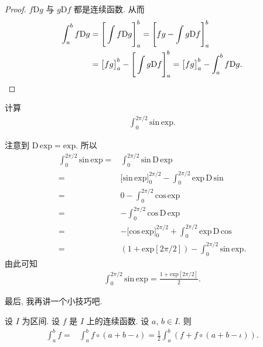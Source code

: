 \begin{proof}
    $f\mathrm{D}g$ 与 $g\mathrm{D}f$ 都是连续函数.
    从而
    \begin{align*}
        \int_{a}^{b} {f\mathrm{D}g}
        = {} & \Bigg[ \int {f\mathrm{D}g} \Bigg]_{a}^{b}
        = \Bigg[ fg - \int {g\mathrm{D}f} \Bigg]_{a}^{b}                          \\
        = {} & \big[ fg \big]_{a}^{b} - \Bigg[ \int {g\mathrm{D}f} \Bigg]_{a}^{b}
        = \big[ fg \big]_{a}^{b} - \int_{a}^{b} {f\mathrm{D}g}. \qedhere
    \end{align*}
\end{proof}

\begin{example}
    计算
    \begin{align*}
        \int_{0}^{2\pi/2} {\mathrm{sin}\, \mathrm{exp}}.
    \end{align*}

    注意到 $\mathrm{D}\,\mathrm{exp} = \mathrm{exp}$.
    所以
    \begin{align*}
        \int_{0}^{2\pi/2} {\mathrm{sin}\, \mathrm{exp}}
        = {} & \int_{0}^{2\pi/2} {\mathrm{sin}\, \mathrm{D}\,\mathrm{exp}}     \\
        = {} & \big[ \mathrm{sin}\,\mathrm{exp} \big]_{0}^{2\pi/2}
        - \int_{0}^{2\pi/2} {\mathrm{exp}\, \mathrm{D}\,\mathrm{sin}}          \\
        = {} & 0 - \int_{0}^{2\pi/2} {\mathrm{cos}\, \mathrm{exp}}             \\
        = {} & {-\int_{0}^{2\pi/2} {\mathrm{cos}\, \mathrm{D}\, \mathrm{exp}}} \\
        = {} & {-\big[ \mathrm{cos}\,\mathrm{exp} \big]}_{0}^{2\pi/2}
        + \int_{0}^{2\pi/2} {\mathrm{exp}\, \mathrm{D}\,\mathrm{cos}}          \\
        = {} & (1 + \mathrm{exp} [2\pi/2])
        - \int_{0}^{2\pi/2} {\mathrm{sin}\, \mathrm{exp}}.
    \end{align*}
    由此可知
    \begin{align*}
        \int_{0}^{2\pi/2} {\mathrm{sin}\, \mathrm{exp}} = \frac{1 + \mathrm{exp} [2\pi/2]}{2}.
    \end{align*}
\end{example}

最后, 我再讲一个小技巧吧.

\begin{theorem}
    设 $I$ 为区间.
    设 $f$ 是 $I$ 上的连续函数.
    设 $a$, $b \in I$.
    则
    \begin{align*}
        \int_{a}^{b} {f}
        = {} & \int_{a}^{b} {f \circ (a + b - \iota)}
        = \frac{1}{2} \int_{a}^{b} {(f + f \circ (a + b - \iota))}.
    \end{align*}
\end{theorem}

